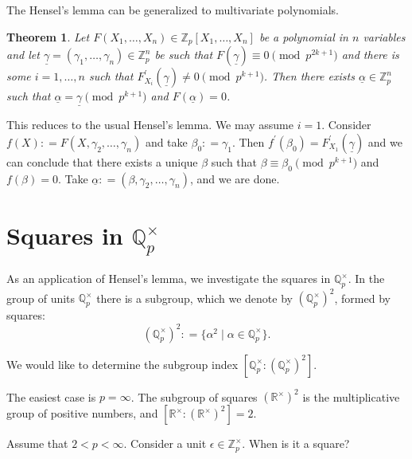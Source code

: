 \documentclass{article}
\newcommand{\dfn}{\mathrel{\mathop:}=}
\newcommand{\ZZ}{\mathbb{Z}}
\newcommand{\QQ}{\mathbb{Q}}
\theoremstyle{myplain}
\newtheorem{theorem}[proposition]{Theorem}
\theoremstyle{mydefinition}
\begin{document}
\vspace{1em}

The Hensel's lemma can be generalized to multivariate polynomials.

\begin{theorem}\label{theorem:multivariate-hensel}
  Let $F (X_1,\ldots,X_n) \in \ZZ_p [X_1,\ldots,X_n]$ be a polynomial in $n$
  variables and let
  $\underline{\gamma} = (\gamma_1, \ldots, \gamma_n) \in \ZZ_p^n$ be such that
  $F (\underline{\gamma}) \equiv 0 \pmod{p^{2k+1}}$ and there is some
  $i = 1,\ldots,n$ such that
  $F^\prime_{X_i} (\underline{\gamma}) \ne 0 \pmod{p^{k+1}}$. Then there exists
  $\underline{\alpha} \in \ZZ_p^n$ such that
  $\underline{\alpha} = \underline{\gamma} \pmod{p^{k+1}}$ and
  $F (\underline{\alpha}) = 0$.
\end{theorem}

This reduces to the usual Hensel's lemma. We may assume $i = 1$. Consider
$f (X) \dfn F (X, \gamma_2, \ldots, \gamma_n)$ and take $\beta_0 \dfn
\gamma_1$. Then $f^\prime (\beta_0) = F^\prime_{X_1} (\underline{\gamma})$ and
we can conclude that there exists a unique $\beta$ such that
$\beta \equiv \beta_0 \pmod{p^{k+1}}$ and $f (\beta) = 0$. Take
$\underline{\alpha} \dfn (\beta, \gamma_2, \ldots, \gamma_n)$, and we are done.

\section{Squares in $\QQ_p^\times$}

As an application of Hensel's lemma, we investigate the squares in
$\QQ_p^\times$. In the group of units $\QQ_p^\times$ there is a subgroup, which
we denote by $(\QQ_p^\times)^2$, formed by squares:
\[ (\QQ_p^\times)^2 \dfn \{ \alpha^2 \mid \alpha \in \QQ_p^\times \}. \]

We would like to determine the subgroup index
$[\QQ_p^\times : (\QQ_p^\times)^2]$.

\vspace{1em}

The easiest case is $p = \infty$. The subgroup of squares
$(\mathbb{R}^\times)^2$ is the multiplicative group of positive numbers, and
$[\mathbb{R}^\times : (\mathbb{R}^\times)^2] = 2$.

\vspace{1em}

Assume that $2 < p < \infty$. Consider a unit $\epsilon \in \ZZ_p^\times$. When
is it a square?
\end{document}
